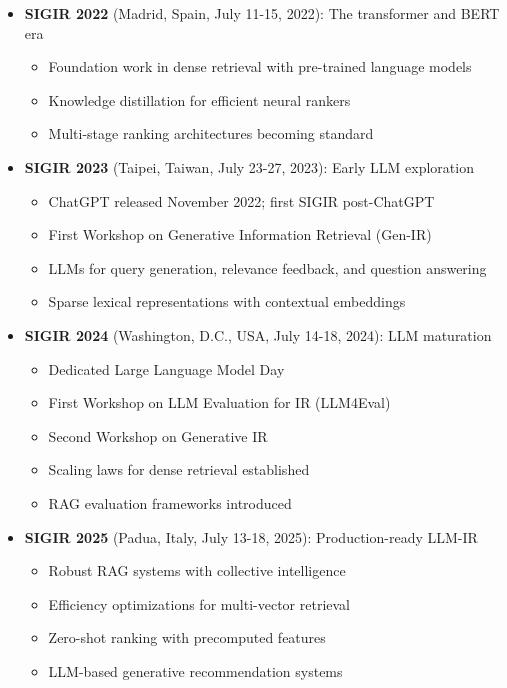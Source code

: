 \documentclass[11pt,letterpaper]{article}
\begin{document}
\begin{itemize}[leftmargin=*]
    \item \textbf{\textcolor{year2022}{SIGIR 2022}} (Madrid, Spain, July 11-15, 2022): The transformer and BERT era
    \begin{itemize}
        \item Foundation work in dense retrieval with pre-trained language models
        \item Knowledge distillation for efficient neural rankers
        \item Multi-stage ranking architectures becoming standard
    \end{itemize}

    \item \textbf{\textcolor{year2023}{SIGIR 2023}} (Taipei, Taiwan, July 23-27, 2023): Early LLM exploration
    \begin{itemize}
        \item ChatGPT released November 2022; first SIGIR post-ChatGPT
        \item First Workshop on Generative Information Retrieval (Gen-IR)
        \item LLMs for query generation, relevance feedback, and question answering
        \item Sparse lexical representations with contextual embeddings
    \end{itemize}

    \item \textbf{\textcolor{year2024}{SIGIR 2024}} (Washington, D.C., USA, July 14-18, 2024): LLM maturation
    \begin{itemize}
        \item Dedicated Large Language Model Day
        \item First Workshop on LLM Evaluation for IR (LLM4Eval)
        \item Second Workshop on Generative IR
        \item Scaling laws for dense retrieval established
        \item RAG evaluation frameworks introduced
    \end{itemize}

    \item \textbf{\textcolor{year2025}{SIGIR 2025}} (Padua, Italy, July 13-18, 2025): Production-ready LLM-IR
    \begin{itemize}
        \item Robust RAG systems with collective intelligence
        \item Efficiency optimizations for multi-vector retrieval
        \item Zero-shot ranking with precomputed features
        \item LLM-based generative recommendation systems
    \end{itemize}
\end{itemize}
\end{document}
